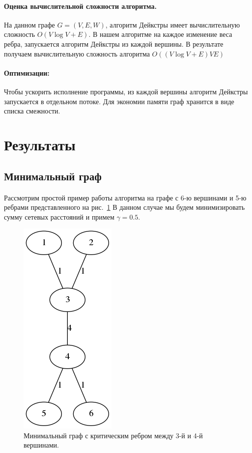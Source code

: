 \documentclass[12pt]{article}
\begin{document}
\paragraph{Оценка вычислительной сложности алгоритма.}

На данном графе $G = (V, E, W)$, алгоритм Дейкстры имеет вычислительную  сложность $O(V \log V + E) $.
В нашем алгоритме на каждое изменение веса ребра, запускается алгоритм Дейкстры из каждой вершины. В результате получаем 
вычислительную сложность алгоритма $O((V \log V + E)VE)$

\paragraph{Оптимизации:}
Чтобы ускорить исполнение программы, из каждой
вершины алгоритм Дейкстры запускается в отдельном
потоке. Для экономии памяти граф хранится в
виде списка смежности.

\section{Результаты}

\subsection{Минимальный граф}

\paragraph{}

Рассмотрим простой пример работы алгоритма на графе с 6-ю вершинами и 5-ю ребрами
представленного на рис.~\ref{fig:min_graph_4} В данном случае мы будем минимизировать сумму сетевых расстояний и
примем $\gamma = 0.5$.

\begin{figure}[h]
    \centering
    \includegraphics[scale=0.7]{min_graph_4.png}
    \caption{Минимальный граф с критическим ребром между 3-й и 4-й вершинами.}
    \label{fig:min_graph_4}
\end{figure}
\end{document}
